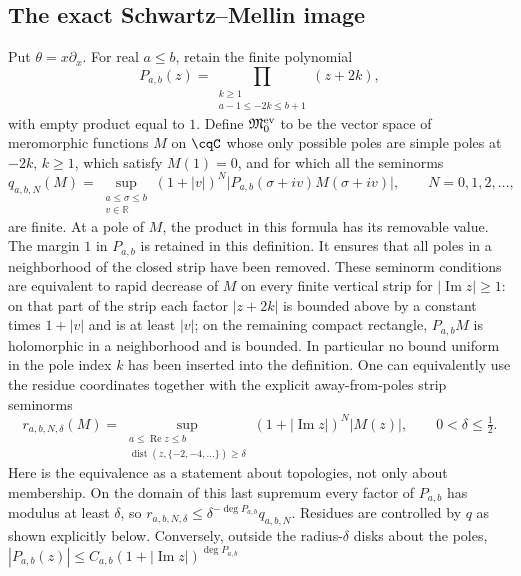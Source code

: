 \subsection{The exact Schwartz--Mellin image}
\label{sec:cq-Schwartz-Mellin-image}
Put $\theta=x\partial_x$. For real $a\leq b$, retain the finite polynomial
\[
 P_{a,b}(z)=\prod_{\substack{k\geq1\\a-1\leq-2k\leq b+1}}(z+2k),
\]
with empty product equal to $1$. Define $\mathfrak M_0^{\rm ev}$
to be the vector space of meromorphic functions $M$ on $\cqC$
whose only possible poles are simple poles at $-2k$, $k\geq1$,
which satisfy $M(1)=0$, and for which all the seminorms
\begin{equation}\label{eq:cq-Mellin-strip-seminorm}
 q_{a,b,N}(M)=
 \sup_{\substack{a\leq\sigma\leq b\\v\in\mathbb R}}
 (1+|v|)^N
 \bigl|P_{a,b}(\sigma+iv)M(\sigma+iv)\bigr|,
 \qquad N=0,1,2,\ldots,
\end{equation}
are finite. At a pole of $M$, the product in this formula has its
removable value. The margin $1$ in $P_{a,b}$ is retained in this
definition. It ensures that all poles in a neighborhood of the
closed strip have been removed. These seminorm conditions are
equivalent to rapid decrease of $M$ on every finite vertical strip
for $|\operatorname{Im}z|\geq1$: on that part of the strip each
factor $|z+2k|$ is bounded above by a constant times $1+|v|$
and is at least $|v|$; on the remaining compact rectangle,
$P_{a,b}M$ is holomorphic in a neighborhood and is bounded.
In particular no bound uniform in the pole index $k$ has been
inserted into the definition.
One can equivalently use the residue coordinates together with
the explicit away-from-poles strip seminorms
\[
 r_{a,b,N,\delta}(M)=
 \sup_{\substack{a\leq\operatorname{Re}z\leq b\\
       \operatorname{dist}(z,\{-2,-4,\ldots\})\geq\delta}}
   (1+|\operatorname{Im}z|)^N|M(z)|,
 \qquad 0<\delta\leq\tfrac12.
\]
Here is the equivalence as a statement about topologies, not only
about membership. On the domain of this last supremum every
factor of $P_{a,b}$ has modulus at least $\delta$, so
$r_{a,b,N,\delta}\leq\delta^{-\deg P_{a,b}}q_{a,b,N}$.
Residues are controlled by $q$ as shown explicitly below.
Conversely, outside the radius-$\delta$ disks about the poles,
$|P_{a,b}(z)|\leq C_{a,b}(1+|\operatorname{Im}z|)^{\deg P_{a,b}}$
